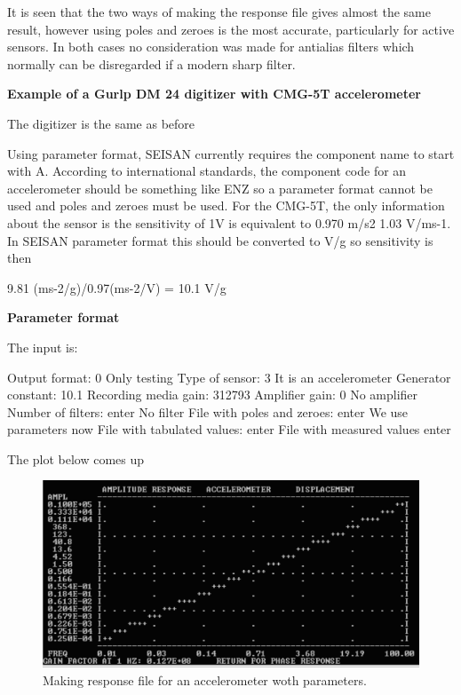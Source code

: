 It is seen that the two ways of making the response file gives almost the same result, however using poles and zeroes is the most accurate, particularly for active sensors. In both cases no consideration was made for antialias filters which normally can be disregarded if a modern sharp filter. 

\textbf{Example of a Gurlp DM 24 digitizer with CMG-5T accelerometer}

The digitizer is the same as before 

Using parameter format, SEISAN currently requires the component name to start with A. According to international standards, the component code for an accelerometer should be something like ENZ so a parameter format cannot be used and poles and zeroes must be used. For the CMG-5T, the only information about the sensor is the sensitivity of 1V is equivalent to 0.970 m/s2 1.03 V/ms-1. In SEISAN parameter format this should be converted to V/g so sensitivity is then 

9.81 (ms-2/g)/0.97(ms-2/V) = 10.1 V/g  

\textbf{Parameter format}

The input is:  

Output format: 0  Only testing  \newline
Type of sensor: 3  It is an accelerometer  \newline
Generator constant: 10.1  \newline
Recording media gain: 312793  \newline
Amplifier gain: 0   No amplifier \newline
Number of filters: enter No filter \newline
File with poles and zeroes: enter We use parameters now \newline
File with tabulated values: enter \newline
File with measured values enter 

The plot below comes up 

\begin{figure}
\centerline{\includegraphics[width=0.9\linewidth]{fig/fig51}}
\caption{Making response file for an accelerometer woth parameters.}
\end{figure}

